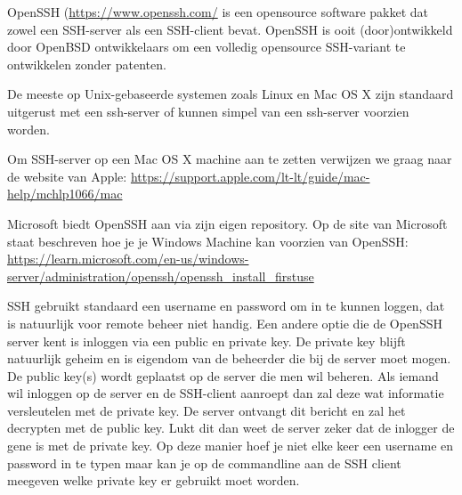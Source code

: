 OpenSSH (\url{https://www.openssh.com/} is een opensource software pakket dat zowel een SSH-server als een SSH-client bevat. OpenSSH is ooit (door)ontwikkeld door OpenBSD ontwikkelaars om een volledig opensource SSH-variant te ontwikkelen zonder patenten.

De meeste op Unix-gebaseerde systemen zoals Linux en Mac OS X zijn standaard uitgerust met een ssh-server of kunnen simpel van een ssh-server voorzien worden.

Om SSH-server op een Mac OS X machine aan te zetten verwijzen we graag naar de website van Apple: \url{https://support.apple.com/lt-lt/guide/mac-help/mchlp1066/mac}

Microsoft biedt OpenSSH aan via zijn eigen repository. Op de site van Microsoft staat beschreven hoe je je Windows Machine kan voorzien van OpenSSH: \url{https://learn.microsoft.com/en-us/windows-server/administration/openssh/openssh_install_firstuse}

SSH gebruikt standaard een username en password om in te kunnen loggen, dat is natuurlijk voor remote beheer niet handig. Een andere optie die de OpenSSH server kent is inloggen via een public en private key. De private key blijft natuurlijk geheim en is eigendom van de beheerder die bij de server moet mogen. De public key(s) wordt geplaatst op de server die men wil beheren. Als iemand wil inloggen op de server en de SSH-client aanroept dan zal deze wat informatie versleutelen met de private key. De server ontvangt dit bericht en zal het decrypten met de public key. Lukt dit dan weet de server zeker dat de inlogger de gene is met de private key. Op deze manier hoef je niet elke keer een username en password in te typen maar kan je op de commandline aan de SSH client meegeven welke private key er gebruikt moet worden.

